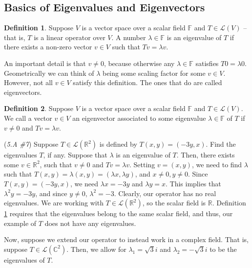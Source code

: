 \documentclass{article}
\renewcommand{\L}{\mathcal{L}}
\newcommand{\F}{\mathbb{F}}
\newcommand{\R}{\mathbb{R}}
\newcommand{\C}{\mathbb{C}}
\theoremstyle{definition}
\newtheorem{definition}{Definition}
\begin{document}
\subsection{Basics of Eigenvalues and Eigenvectors}
\label{sec: eigenvalues-and-eigenvectors}
\begin{definition}
    \label{def: eigenvalues}
    Suppose $V$ is a vector space over a scalar field $\F$ and $T \in \L(V)$ -- that is, $T$ is a linear operator over $V$. A number $\lambda \in \F$ is an eigenvalue of $T$ if there exists a non-zero vector $v \in V$ such that $Tv = \lambda v$.
\end{definition}
An important detail is that $v \neq 0$, because otherwise any $\lambda \in \F$ satisfies $T0 = \lambda 0$. Geometrically we can think of $\lambda$ being some scaling factor for some $v \in V$. However, not all $v \in V$ satisfy this definition. The ones that do are called eigenvectors.
\begin{definition}
    Suppose $V$ is a vector space over a scalar field $\F$ and $T \in \L(V)$. We call a vector $v \in V$ an eigenvector associated to some eigenvalue $\lambda \in \F$ of $T$ if $v \neq 0$ and $Tv = \lambda v$.
\end{definition}
\begin{problem}{(\textit{5.A \#7}) Suppose $T \in \L(\R^2)$ is defined by $T(x, y) = (-3y, x)$. Find the eigenvalues $T$, if any.}
    Suppose that $\lambda$ is an eigenvalue of $T$. Then, there exists some $v \in \R^2$, such that $v \neq 0$ and $Tv = \lambda v$. Setting $v = (x, y)$, we need to find $\lambda$ such that $T(x, y) = \lambda(x, y) = (\lambda x, \lambda y)$, and $x \neq 0, y \neq 0$. Since $T(x, y) = (-3y, x)$, we need $\lambda x= -3y$ and $\lambda y = x$. This implies that $\lambda^2 y = -3y$, and since $y \neq 0$, $\lambda^2 = -3$. Clearly, our operator has no real eigenvalues. We are working with $T \in \L(\R^2)$, so the scalar field is $\R$. Definition \ref{def: eigenvalues} requires that the eigenvalues belong to the same scalar field, and thus, our example of $T$ does not have any eigenvalues.

    Now, suppose we extend our operator to instead work in a complex field. That is, suppose $T \in \L(\C^2)$. Then, we allow for $\lambda_1 = \sqrt{3}i$ and $\lambda_2 = -\sqrt{3}i$ to be the eigenvalues of $T$.
\end{problem}
\end{document}
